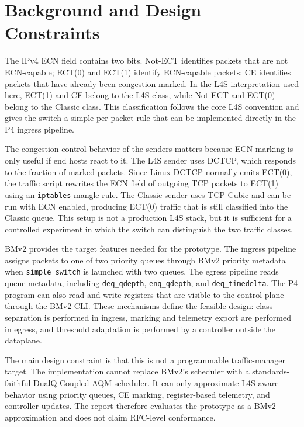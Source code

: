 \documentclass[10pt]{article}
\begin{document}
\section{Background and Design Constraints}

The IPv4 ECN field contains two bits. Not-ECT identifies packets that are not ECN-capable; ECT(0) and ECT(1) identify ECN-capable packets; CE identifies packets that have already been congestion-marked. In the L4S interpretation used here, ECT(1) and CE belong to the L4S class, while Not-ECT and ECT(0) belong to the Classic class. This classification follows the core L4S convention and gives the switch a simple per-packet rule that can be implemented directly in the P4 ingress pipeline.

The congestion-control behavior of the senders matters because ECN marking is only useful if end hosts react to it. The L4S sender uses DCTCP, which responds to the fraction of marked packets. Since Linux DCTCP normally emits ECT(0), the traffic script rewrites the ECN field of outgoing TCP packets to ECT(1) using an \texttt{iptables} mangle rule. The Classic sender uses TCP Cubic and can be run with ECN enabled, producing ECT(0) traffic that is still classified into the Classic queue. This setup is not a production L4S stack, but it is sufficient for a controlled experiment in which the switch can distinguish the two traffic classes.

BMv2 provides the target features needed for the prototype. The ingress pipeline assigns packets to one of two priority queues through BMv2 priority metadata when \texttt{simple\_switch} is launched with two queues. The egress pipeline reads queue metadata, including \texttt{deq\_qdepth}, \texttt{enq\_qdepth}, and \texttt{deq\_timedelta}. The P4 program can also read and write registers that are visible to the control plane through the BMv2 CLI. These mechanisms define the feasible design: class separation is performed in ingress, marking and telemetry export are performed in egress, and threshold adaptation is performed by a controller outside the dataplane.

The main design constraint is that this is not a programmable traffic-manager target. The implementation cannot replace BMv2's scheduler with a standards-faithful DualQ Coupled AQM scheduler. It can only approximate L4S-aware behavior using priority queues, CE marking, register-based telemetry, and controller updates. The report therefore evaluates the prototype as a BMv2 approximation and does not claim RFC-level conformance.
\end{document}
